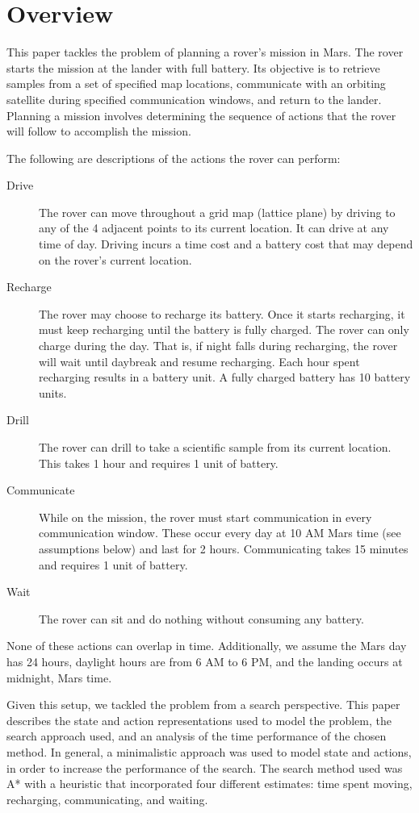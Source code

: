 \section{Overview}

This paper tackles the problem of planning a rover's mission in Mars. The rover starts the mission at the
lander with full battery. Its objective is to retrieve samples from a set of specified map locations,
communicate with an orbiting satellite during specified communication windows, and return to the lander.
Planning a mission involves determining the sequence of actions that the rover will follow to accomplish
the mission.

The following are descriptions of the actions the rover can perform:

\begin{description}
	\item[Drive] The rover can move throughout a grid map (lattice plane) by driving to any of the 4 adjacent
		points to its current location. It can drive at any time of day. Driving incurs a time cost and a battery
		cost that may depend on the rover's current location.
	\item[Recharge] The rover may choose to recharge its battery. Once it starts recharging, it must keep
		recharging until the battery is fully charged. The rover can only charge during the day. That is, if night
		falls during recharging, the rover will wait until daybreak and resume recharging. Each hour spent
		recharging results in a battery unit. A fully charged battery has 10 battery units.
	\item[Drill] The rover can drill to take a scientific sample from its current location. This takes 1 hour and
		requires 1 unit of battery.
	\item[Communicate] While on the mission, the rover must start communication in every communication window. These
		occur every day at 10 AM Mars time (see assumptions below) and last for 2 hours. Communicating takes 15
		minutes and requires 1 unit of battery.
	\item[Wait] The rover can sit and do nothing without consuming any battery.
\end{description}

None of these actions can overlap in time. Additionally, we assume the Mars day has 24 hours, daylight hours
are from 6 AM to 6 PM, and the landing occurs at midnight, Mars time.

Given this setup, we tackled the problem from a search perspective. This paper describes the state
and action representations used to model the problem, the search approach used, and an analysis of the
time performance of the chosen method. In general, a minimalistic approach was used to model state and
actions, in order to increase the performance of the search. The search method used was A* with a heuristic
that incorporated four different estimates: time spent moving, recharging, communicating, and waiting.